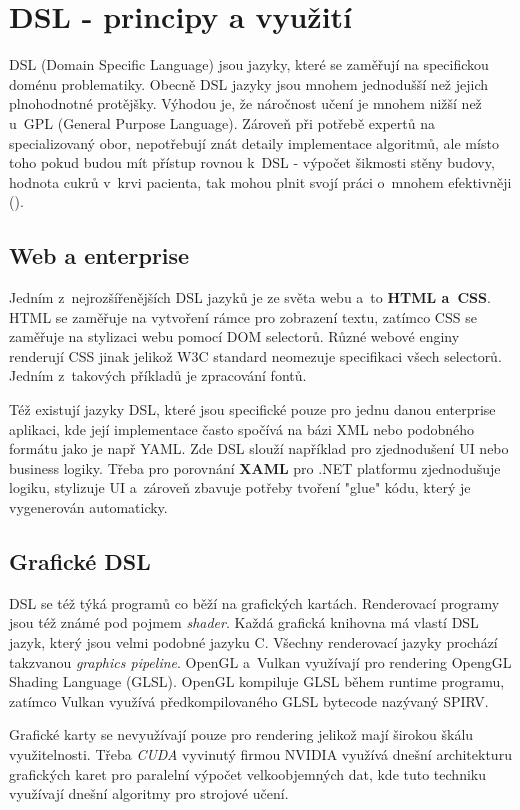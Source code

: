 \documentclass[male, czech]{kithesis}
\begin{document}
\chapter{DSL - principy a využití}
DSL (Domain Specific Language) jsou jazyky, 
které se zaměřují na specifickou doménu problematiky.
Obecně DSL jazyky jsou mnohem jednodušší než jejich plnohodnotné protějšky. 
Výhodou je, 
že náročnost učení je mnohem nižší než u~GPL (General Purpose Language). 
Zároveň při potřebě expertů na specializovaný obor, 
nepotřebují znát detaily implementace algoritmů, 
ale místo toho pokud budou mít přístup rovnou k~DSL - výpočet šikmosti stěny budovy,
hodnota cukrů v~krvi pacienta, 
tak mohou plnit svojí práci o~mnohem efektivněji (\cite{DomainSpecificLanguages}).

\section{Web a enterprise}
Jedním z~nejrozšířenějších DSL jazyků je ze světa webu a~to \textbf{HTML a~CSS}. 
HTML se zaměřuje na vytvoření rámce pro zobrazení textu,
zatímco CSS se zaměřuje na stylizaci webu pomocí DOM selectorů. 
Různé webové enginy renderují CSS jinak jelikož W3C standard neomezuje specifikaci
všech selectorů.
Jedním z~takových příkladů je zpracování fontů.

Též existují jazyky DSL, 
které jsou specifické pouze pro jednu danou enterprise aplikaci, 
kde její implementace často spočívá na bázi XML nebo podobného formátu jako je např YAML. 
Zde DSL slouží například pro zjednodušení UI nebo business logiky. 
Třeba pro porovnání \textbf{XAML} pro .NET platformu zjednodušuje logiku, 
stylizuje UI a~zároveň zbavuje potřeby tvoření "glue" kódu, 
který je vygenerován automaticky.

\section{Grafické DSL}
DSL se též týká programů co běží na grafických kartách. 
Renderovací programy jsou též známé pod pojmem \textit{shader}.
Každá grafická knihovna má vlastí DSL jazyk, 
který jsou velmi podobné jazyku C.
Všechny renderovací jazyky prochází takzvanou \textit{graphics pipeline}. 
OpenGL a~Vulkan využívají pro rendering OpengGL Shading Language (GLSL). 
OpenGL kompiluje GLSL během runtime programu,
zatímco Vulkan využívá předkompilovaného GLSL bytecode nazývaný SPIRV.

Grafické karty se nevyužívají pouze pro rendering jelikož mají širokou škálu
využitelnosti. 
Třeba \textit{CUDA} vyvinutý firmou NVIDIA 
využívá dnešní architekturu grafických karet pro paralelní výpočet 
velkoobjemných dat, kde tuto techniku využívají dnešní algoritmy pro 
strojové učení. 
\end{document}

